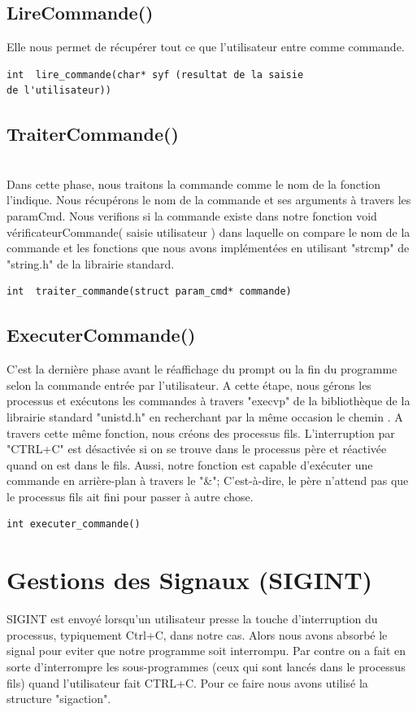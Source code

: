 \subsection{LireCommande()}
Elle nous permet de récupérer tout ce que l'utilisateur entre comme commande.
\\
\begin{lstlisting}[frame=single]
int  lire_commande(char* syf (resultat de la saisie 
de l'utilisateur))

\end{lstlisting}
\subsection{TraiterCommande()}
\\
Dans cette phase, nous traitons la commande comme le nom de la fonction l'indique. Nous récupérons le nom de la commande et ses arguments à travers les paramCmd.  Nous verifions si la commande existe dans notre fonction {\selectfont void vérificateurCommande( saisie utilisateur ){}} dans laquelle on compare le nom de la commande et les fonctions que nous avons implémentées en utilisant "strcmp" de "string.h" de la librairie standard.
 
\begin{lstlisting}[frame=single]
int  traiter_commande(struct param_cmd* commande)
\end{lstlisting}
\subsection{ExecuterCommande()}
C'est la dernière phase avant le réaffichage du prompt ou la fin du programme selon la  commande entrée par l'utilisateur. A cette étape, nous gérons les processus et exécutons les commandes à travers "execvp" de la bibliothèque de la librairie standard "unistd.h" en recherchant par la même occasion le chemin . A travers cette même fonction, nous créons des processus fils. L'interruption par "CTRL+C" est désactivée si on se trouve dans le processus père et réactivée quand on est dans le fils. Aussi, notre fonction est capable d'exécuter une commande en arrière-plan à travers le "&"; C'est-à-dire, le père n'attend pas que le processus fils ait fini pour passer à autre chose.
\\
\begin{lstlisting}[frame=single]
int executer_commande() 
\end{lstlisting}


\section{Gestions des Signaux (SIGINT)}
SIGINT est envoyé lorsqu'un utilisateur presse la touche d'interruption du processus, typiquement Ctrl+C, dans notre cas. Alors nous avons absorbé le signal pour eviter que notre programme soit interrompu. Par contre on a fait en sorte d'interrompre les sous-programmes (ceux qui sont lancés dans le processus fils) quand l'utilisateur fait CTRL+C. Pour ce faire nous avons utilisé la structure "sigaction".

